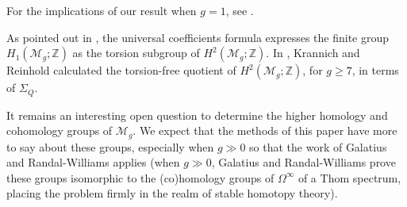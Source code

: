 \begin{rmk}
For the implications of our result when $g=1$, see \cite[Corollary E]{KrannichMappingClass}.
\end{rmk}

\begin{rmk} \label{rmk:MillerMoritaMumford}
As pointed out in \cite[Remark 6.2]{GRHandbook}, the universal coefficients formula expresses the finite group $H_1(\mathcal{M}_g;\mathbb{Z})$ as the torsion subgroup of $H^2(\mathcal{M}_g;\mathbb{Z})$. 
In \cite{KrannichCharacteristic}, Krannich and Reinhold calculated the torsion-free quotient of $H^2(\mathcal{M}_g;\mathbb{Z})$, for $g \ge 7$, in terms of $\Sigma_Q$.
\end{rmk}

It remains an interesting open question to determine the higher homology and cohomology groups of $\mathcal{M}_g$.  We expect that the methods of this paper have more to say about these groups, especially when $g \gg 0$ so that the work of Galatius and Randal-Williams \cite{GRAbelianQuotients, GRHandbook} applies (when $g \gg 0$, Galatius and Randal-Williams prove these groups isomorphic to the (co)homology groups of $\Omega^{\infty}$ of a Thom spectrum, placing the problem firmly in the realm of stable homotopy theory).


